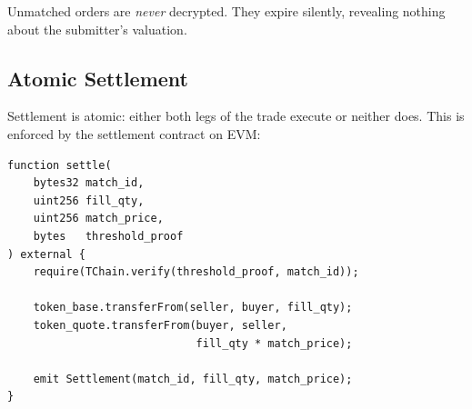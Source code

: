 Unmatched orders are \emph{never} decrypted. They expire silently, revealing nothing about the submitter's valuation.

\subsection{Atomic Settlement}

Settlement is atomic: either both legs of the trade execute or neither does. This is enforced by the settlement contract on \Zoo{} EVM:

\begin{verbatim}
function settle(
    bytes32 match_id,
    uint256 fill_qty,
    uint256 match_price,
    bytes   threshold_proof
) external {
    require(TChain.verify(threshold_proof, match_id));

    token_base.transferFrom(seller, buyer, fill_qty);
    token_quote.transferFrom(buyer, seller,
                             fill_qty * match_price);

    emit Settlement(match_id, fill_qty, match_price);
}
\end{verbatim}

